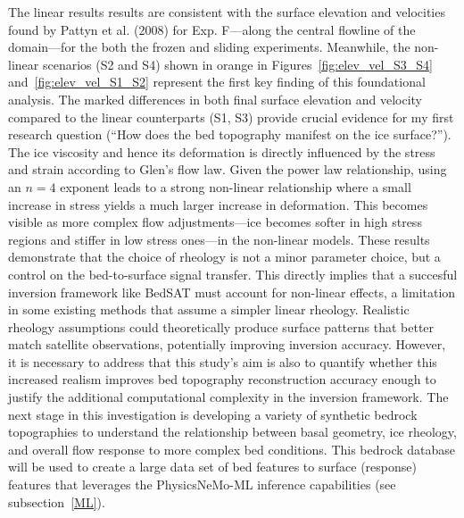 The linear results results are consistent with the surface elevation and velocities found by Pattyn et al. (2008) for Exp. F—along the central flowline of the domain—for the both the frozen and sliding experiments. Meanwhile, the non-linear scenarios (S2 and S4) shown in orange in Figures~\ref{fig:elev_vel_S3_S4} and~\ref{fig:elev_vel_S1_S2} represent the first key finding of this foundational analysis. The marked differences in both final surface elevation and velocity compared to the linear counterparts (S1, S3) provide crucial evidence for my first research question (``How does the bed topography manifest on the ice surface?''). The ice viscosity and hence its deformation is directly influenced by the stress and strain according to Glen's flow law. Given the power law relationship, using an $n = 4$ exponent leads to a strong non-linear relationship where a small increase in stress yields a much larger increase in deformation. This becomes visible as more complex flow adjustments—ice becomes softer in high stress regions and stiffer in low stress ones—in the non-linear models. These results demonstrate that the choice of rheology is not a minor parameter choice, but a control on the bed-to-surface signal transfer. This directly implies that a succesful inversion framework like BedSAT must account for non-linear effects, a limitation in some existing methods that assume a simpler linear rheology.
Realistic rheology assumptions could theoretically produce surface patterns that better match satellite observations, potentially improving inversion accuracy. However, it is necessary to address that this study's aim is also to quantify whether this increased realism improves bed topography reconstruction accuracy enough to justify the additional computational complexity in the inversion framework. The next stage in this investigation is developing a variety of synthetic bedrock topographies to understand the relationship between basal geometry, ice rheology, and overall flow response to more complex bed conditions. This bedrock database will be used to create a large data set of bed features to surface (response) features that leverages the PhysicsNeMo-ML inference capabilities (see subsection~\ref{ML}).

\newpage
